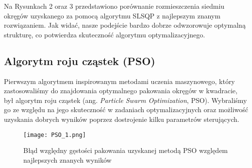 \documentclass{article}
\begin{document}
Na Rysunkach 2 oraz 3 przedstawiono porównanie rozmieszczenia siedmiu okręgów uzyskanego za pomocą algorytmu SLSQP z najlepszym znanym rozwiązaniem. Jak widać, nasze podejście bardzo dobrze odwzorowuje optymalną strukturę, co potwierdza skuteczność algorytmu optymalizacyjnego.





\subsection{Algorytm roju cząstek (PSO)}

Pierwszym algorytmem inspirowanym metodami uczenia maszynowego, który zastosowaliśmy do znajdowania optymalnego pakowania okręgów w kwadracie, był algorytm roju cząstek (ang. \textit{Particle Swarm Optimization}, PSO). Wybraliśmy go ze względu na jego skuteczność w zadaniach optymalizacyjnych oraz możliwość uzyskania dobrych wyników poprzez dostrojenie kilku parametrów sterujących.

\begin{table}[ht]
\centering
{}
\caption{Porównanie wyników gęstości dla PSO i najlepszych znanych wartości}
\end{table}

\begin{figure}[H]
    \centering
    \texttt{[image: PSO\_1.png]}
    \caption{Błąd względny gęstości pakowania uzyskanej metodą PSO względem najlepszych znanych wyników}
    \label{fig:pso-error}
\end{figure}
\end{document}
